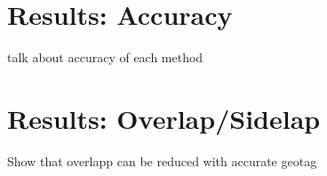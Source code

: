 \documentclass{article}
\begin{document}
\section{Results: Accuracy}
talk about accuracy of each method
\section{Results: Overlap/Sidelap}
Show that overlapp can be reduced with accurate geotag
\thispagestyle{lastpage}
\end{document}
